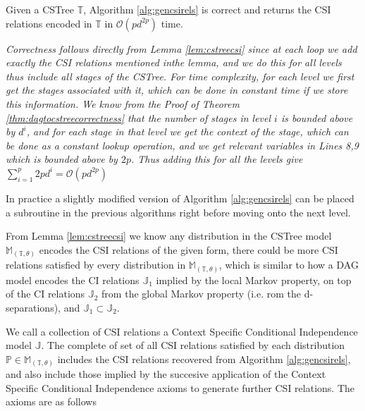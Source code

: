 \documentclass{tufte-book}
\begin{document}
\begin{theorem}\label{thm:gencsirelscorrectness}
Given a CSTree $\mathbb{T}$, Algorithm \ref{alg:gencsirels} is correct and returns the CSI relations encoded in $\mathbb{T}$ in $\mathcal{O}(pd^{2p})$ time.
\end{theorem}
\textit{Correctness follows directly from Lemma \ref{lem:cstreecsi} since at each loop we add exactly the CSI relations mentioned inthe lemma, and we do this for all levels thus include all stages of the CSTree. For time complexity, for each level we first get the stages associated with it, which can be done in constant time if we store this information. We know from the Proof of Theorem \ref{thm:dagtocstreecorrectness} that the number of stages in level $i$ is bounded above by $d^i$, and for each stage in that level we get the context of the stage, which can be done as a constant lookup operation, and we get relevant variables in Lines 8,9 which is bounded above by $2p$. Thus adding this for all the levels give $\sum_{i=1}^p 2pd^i = \mathcal{O}(pd^{2p})$
}


In practice a slightly modified version of Algorithm \ref{alg:gencsirels} can be placed a subroutine in the previous algorithms right before moving onto the next level.


From Lemma \ref{lem:cstreecsi} we know any distribution in the CSTree model \(\mathbb{M}_{(\mathbb{T},\theta)}\) encodes the CSI relations of the given form, there could be more CSI relations satisfied by every distribution in \(\mathbb{M}_{(\mathbb{T},\theta)}\), which is similar to how a DAG model encodes the CI relations \(\mathbb{J}_1\) implied by the local Markov property, on top of the CI relations \(\mathbb{J}_2\) from the global Markov property (i.e. rom the d-separations), and \(\mathbb{J}_1 \subset \mathbb{J}_2\).


We call a collection of CSI relations a Context Specific Conditional Independence model \(\mathbb{J}\). The complete of set of all CSI relations satisfied by each distribution \(\mathbb{P} \in \mathbb{M}_{(\mathbb{T},\theta)}\) includes the CSI relations recovered from Algorithm \ref{alg:gencsirels}, and also include those implied by the succesive application of the Context Specific Conditional Independence axioms to generate further CSI relations. The axioms are as follows
\end{document}
